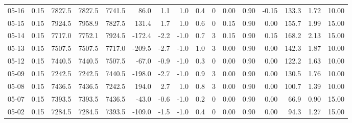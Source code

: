 \begin{threeparttable}
{\begin{tabular}{lrrrrrrrrrrrrrrr}
  05-16 &     0.15 & 7827.5 & 7827.5 & 7741.5 &       86.0 &            1.1 &                      1.0 &                 0.4 &              0 &       0.00 &      0.90 &          -0.15 &            133.3 &            1.72 &                  10.00 \\
  05-15 &     0.15 & 7924.5 & 7958.9 & 7827.5 &      131.4 &            1.7 &                      1.0 &                 0.6 &              0 &       0.15 &      0.90 &           0.00 &            155.7 &            1.99 &                  15.00 \\
  05-14 &     0.15 & 7717.0 & 7752.1 & 7924.5 &     -172.4 &           -2.2 &                     -1.0 &                 0.7 &              3 &       0.15 &      0.90 &           0.15 &            168.2 &            2.13 &                  15.00 \\
  05-13 &     0.15 & 7507.5 & 7507.5 & 7717.0 &     -209.5 &           -2.7 &                     -1.0 &                 1.0 &              3 &       0.00 &      0.90 &           0.00 &            142.3 &            1.87 &                  10.00 \\
  05-12 &     0.15 & 7440.5 & 7440.5 & 7507.5 &      -67.0 &           -0.9 &                     -1.0 &                 0.3 &              0 &       0.00 &      0.90 &           0.00 &            122.2 &            1.63 &                  10.00 \\
  05-09 &     0.15 & 7242.5 & 7242.5 & 7440.5 &     -198.0 &           -2.7 &                     -1.0 &                 0.9 &              3 &       0.00 &      0.90 &           0.00 &            130.5 &            1.76 &                  10.00 \\
  05-08 &     0.15 & 7436.5 & 7436.5 & 7242.5 &      194.0 &            2.7 &                      1.0 &                 0.8 &              3 &       0.00 &      0.90 &           0.00 &            100.7 &            1.39 &                  10.00 \\
  05-07 &     0.15 & 7393.5 & 7393.5 & 7436.5 &      -43.0 &           -0.6 &                     -1.0 &                 0.2 &              0 &       0.00 &      0.90 &           0.00 &             66.9 &            0.90 &                  15.00 \\
  05-02 &     0.15 & 7284.5 & 7284.5 & 7393.5 &     -109.0 &           -1.5 &                     -1.0 &                 0.4 &              0 &       0.00 &      0.90 &           0.00 &             94.3 &            1.27 &                  15.00 \\

\end{tabular}}
\end{threeparttable}
